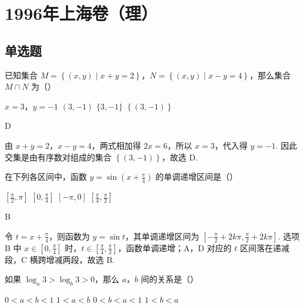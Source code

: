 \documentclass[UTF8,a4paper,oneside,11pt]{ctexbook}
\begin{document}
\mainmatter

\chapter{1996年上海卷（理）}
\section{单选题}

\begin{problem}
已知集合 \(M=\left\{(x,y)\mid x+y=2\right\}\)，\(N=\left\{(x,y)\mid x-y=4\right\}\)，那么集合 \(M\cap N\) 为（\quad）

\choices
    {\(x=3\)，\(y=-1\)}
    {\((3,-1)\)}
    {\(\{3,-1\}\)}
    {\(\left\{(3,-1)\right\}\)}
\end{problem}

\begin{answer}
D
\end{answer}

\begin{solution}
由 \(x+y=2\)，\(x-y=4\)，两式相加得 \(2x=6\)，所以 \(x=3\)，代入得 \(y=-1\). 因此交集是由有序数对组成的集合 \(\left\{(3,-1)\right\}\)，故选 D.
\end{solution}

\begin{problem}
在下列各区间中，函数 \(y=\sin\left(x+\frac{\pi}{4}\right)\) 的单调递增区间是（\quad）

\choices
    {\(\left[\frac{\pi}{2},\pi\right]\)}
    {\(\left[0,\frac{\pi}{4}\right]\)}
    {\(\left[-\pi,0\right]\)}
    {\(\left[\frac{\pi}{4},\frac{\pi}{2}\right]\)}
\end{problem}

\begin{answer}
B
\end{answer}

\begin{solution}
令 \(t=x+\frac{\pi}{4}\)，则函数为 \(y=\sin t\)，其单调递增区间为 \(\left[-\frac{\pi}{2}+2k\pi,\frac{\pi}{2}+2k\pi\right]\). 选项 B 中 \(x\in\left[0,\frac{\pi}{4}\right]\) 时，\(t\in\left[\frac{\pi}{4},\frac{\pi}{2}\right]\)，函数单调递增；A，D 对应的 \(t\) 区间落在递减段，C 横跨增减两段，故选 B.
\end{solution}

\begin{problem}
如果 \(\log_{a}3>\log_{b}3>0\)，那么 \(a\)，\(b\) 间的关系是（\quad）

\choices
    {\(0<a<b<1\)}
    {\(1<a<b\)}
    {\(0<b<a<1\)}
    {\(1<b<a\)}
\end{problem}
\end{document}
